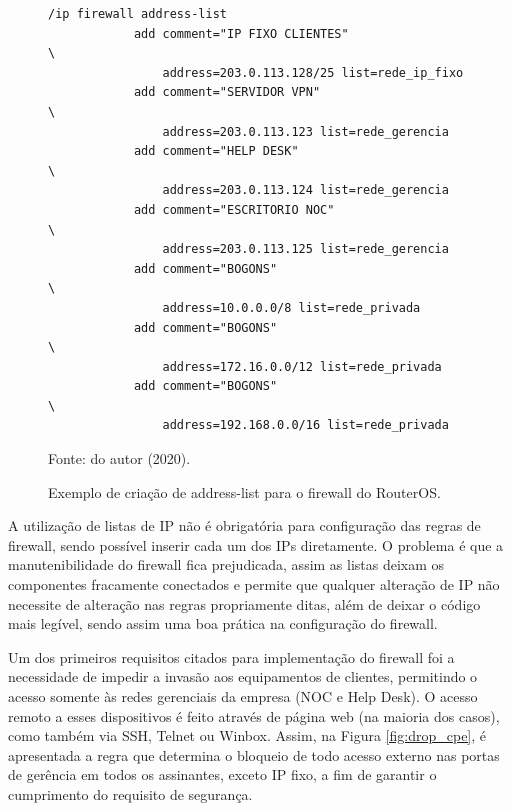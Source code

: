     \begin{figure}[!htb]
        \centering
        \caption{Exemplo de criação de address-list para o firewall do RouterOS.} 
        \label{fig:firewall_addrlist}
        
        \begin{Verbatim}[fontsize=\normalsize]
            /ip firewall address-list
            add comment="IP FIXO CLIENTES"                  \
                address=203.0.113.128/25 list=rede_ip_fixo
            add comment="SERVIDOR VPN"                      \
                address=203.0.113.123 list=rede_gerencia
            add comment="HELP DESK"                         \
                address=203.0.113.124 list=rede_gerencia
            add comment="ESCRITORIO NOC"                    \
                address=203.0.113.125 list=rede_gerencia
            add comment="BOGONS"                            \
                address=10.0.0.0/8 list=rede_privada
            add comment="BOGONS"                            \
                address=172.16.0.0/12 list=rede_privada
            add comment="BOGONS"                            \
                address=192.168.0.0/16 list=rede_privada
        \end{Verbatim} 

        {\small Fonte: do autor (2020).} 
    \end{figure}
    
    A utilização de listas de IP não é obrigatória para configuração das regras de firewall, sendo possível inserir cada um dos IPs diretamente. O problema é que a manutenibilidade do firewall fica prejudicada, assim as listas deixam os componentes fracamente conectados e permite que qualquer alteração de IP não necessite de alteração nas regras propriamente ditas, além de deixar o código mais legível, sendo assim uma boa prática na configuração do firewall.
    
    
    
    Um dos primeiros requisitos citados para implementação do firewall foi a necessidade de impedir a invasão aos equipamentos de clientes, permitindo o acesso somente às redes gerenciais da empresa (NOC e Help Desk). O acesso remoto a esses dispositivos é feito através de página web (na maioria dos casos), como também via SSH, Telnet ou Winbox. Assim, na Figura \ref{fig:drop_cpe}, é apresentada a regra que determina o bloqueio de todo acesso externo nas portas de gerência em todos os assinantes, exceto IP fixo, a fim de garantir o cumprimento do requisito de segurança.
    
